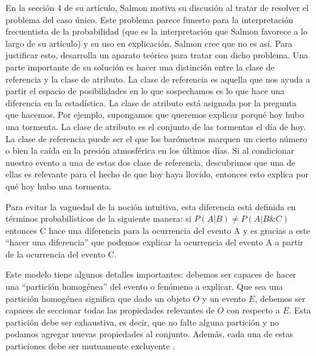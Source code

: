 En la sección 4 de su artículo, Salmon motiva su discusión al tratar de resolver el problema del caso único. Este problema parece funesto para la interpretación frecuentista de la probabilidad (que es la interpretación que Salmon favorece a lo largo de su artículo) y su uso en explicación. Salmon cree que no es así. Para justificar esto, desarrolla un aparato teórico para tratar con dicho problema. Una parte importante de su solución es hacer una distinción entre la clase de referencia y la clase de atributo. La clase de referencia es aquella que nos ayuda a partir el espacio de posibilidades en lo que sospechamos es lo que hace una diferencia en la estadística. La clase de atributo está asignada por la pregunta que hacemos. Por ejemplo, supongamos que queremos explicar porqué hoy hubo una tormenta. La clase de atributo es el conjunto de las tormentas el día de hoy. La clase de referencia puede ser el que los barómetros marquen un cierto número o bien la caída en la presión atmosférica en los últimos días. Si al condicionar nuestro evento a una de estas dos clase de referencia, descubrimos que una de ellas es relevante para el hecho de que hoy haya llovido, entonces esto explica por qué hoy hubo una tormenta.

Para evitar la vaguedad de la noción intuitiva, esta diferencia está definida en términos probabilísticos de la siguiente manera: si $P(A|B) \neq P(A|B\&C)$ entonces C hace una diferencia para la ocurrencia del evento A y es gracias a este ``hacer una diferencia'' que podemos explicar la ocurrencia del evento A a partir de la ocurrencia del evento C.

Este modelo tiene algunos detalles importantes: debemos ser capaces de hacer una ``partición homogénea'' del evento o fenómeno a explicar. Que sea una partición homogénea significa que dado un objeto $O$ y un evento $E$, debemos ser capaces de seccionar todas las propiedades relevantes de $O$ con respecto a $E$. Esta partición debe ser exhaustiva, es decir, que no falte alguna partición y no podamos agregar nuevas propiedades al conjunto. Además, cada una de estas particiones debe ser mutuamente excluyente \cite{Woodward2019}.

